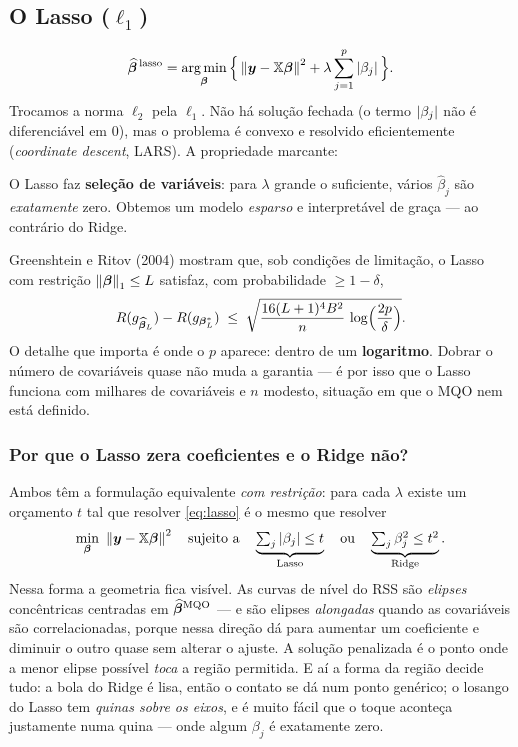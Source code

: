 \documentclass[11pt,a4paper]{article}
\begin{document}
\subsection{O Lasso ($\ell_1$)}
\begin{equation}\label{eq:lasso}
  \widehat{\bbeta}^{\,\text{lasso}}
   = \argmin_{\bbeta}\Big\{ \norm{\bm{y}-\mathbb{X}\bbeta}^2
       + \lambda \sum_{j=1}^{p}\abs{\beta_j} \Big\}.
\end{equation}
Trocamos a norma $\ell_2$ pela $\ell_1$. Não há solução fechada (o termo
$\left\lvert \beta_j \right\rvert$ não é diferenciável em $0$), mas o problema é convexo e resolvido
eficientemente (\emph{coordinate descent}, LARS). A propriedade marcante:

\begin{ideia}
O Lasso faz \textbf{seleção de variáveis}: para $\lambda$ grande o suficiente,
vários $\widehat\beta_j$ são \emph{exatamente} zero. Obtemos um modelo
\emph{esparso} e interpretável de graça --- ao contrário do Ridge.
\end{ideia}

\begin{observacao}
Greenshtein e Ritov (2004) mostram que, sob condições de limitação, o Lasso com
restrição $\left\lVert \bm{\beta} \right\rVert_1\le L$ satisfaz, com probabilidade $\ge 1-\delta$,
\[
  R(g_{\widehat{\bm{\beta}}_L}) - R(g_{\bm{\beta}^*_L})
  \;\le\; \sqrt{\frac{16(L+1)^4B^2}{n}\,\log\!\Big(\frac{2p}{\delta}\Big)} .
\]
O detalhe que importa é onde o $p$ aparece: dentro de um \textbf{logaritmo}. Dobrar
o número de covariáveis quase não muda a garantia --- é por isso que o Lasso funciona
com milhares de covariáveis e $n$ modesto, situação em que o MQO nem está definido.
\end{observacao}

\subsubsection*{Por que o Lasso zera coeficientes e o Ridge não?}
Ambos têm a formulação equivalente \emph{com restrição}: para cada $\lambda$ existe
um orçamento $t$ tal que resolver \eqref{eq:lasso} é o mesmo que resolver
\[
  \min_{\bm{\beta}}\ \left\lVert \bm{y}-\mathbb{X}\bm{\beta} \right\rVert^2
  \quad\text{sujeito a}\quad
  \underbrace{\textstyle\sum_j\left\lvert \beta_j \right\rvert\le t}_{\text{Lasso}}
  \quad\text{ou}\quad
  \underbrace{\textstyle\sum_j\beta_j^2\le t^2}_{\text{Ridge}}.
\]
Nessa forma a geometria fica visível. As curvas de nível do RSS são
\emph{elipses} concêntricas centradas em $\widehat{\bm{\beta}}^{\text{MQO}}$ --- e são
elipses \emph{alongadas} quando as covariáveis são correlacionadas, porque nessa
direção dá para aumentar um coeficiente e diminuir o outro quase sem alterar o
ajuste. A solução penalizada é o ponto onde a menor elipse possível \emph{toca} a
região permitida. E aí a forma da região decide tudo: a bola do Ridge é lisa, então o
contato se dá num ponto genérico; o losango do Lasso tem \emph{quinas sobre os
eixos}, e é muito fácil que o toque aconteça justamente numa quina --- onde algum
$\beta_j$ é exatamente zero.
\end{document}
